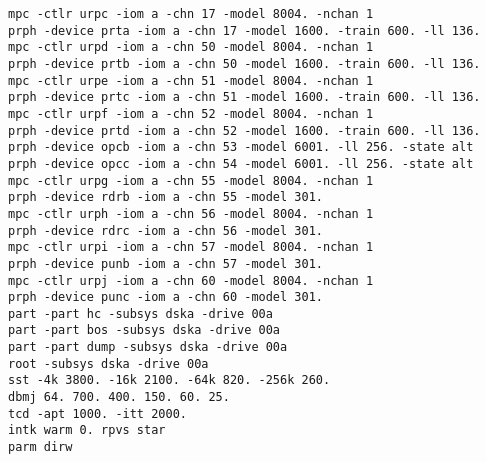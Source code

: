 \begin{adjustwidth}{5ex}{1ex}
    \texttt{mpc  -ctlr   urpc -iom a -chn 17 -model 8004. -nchan 1} \\
    \texttt{prph -device prta -iom a -chn 17 -model 1600. -train 600. -ll 136.} \\
    \texttt{mpc  -ctlr   urpd -iom a -chn 50 -model 8004. -nchan 1} \\
    \texttt{prph -device prtb -iom a -chn 50 -model 1600. -train 600. -ll 136.} \\
    \texttt{mpc  -ctlr   urpe -iom a -chn 51 -model 8004. -nchan 1} \\
    \texttt{prph -device prtc -iom a -chn 51 -model 1600. -train 600. -ll 136.} \\
    \texttt{mpc  -ctlr   urpf -iom a -chn 52 -model 8004. -nchan 1} \\
    \texttt{prph -device prtd -iom a -chn 52 -model 1600. -train 600. -ll 136.} \\
    \texttt{prph -device opcb -iom a -chn 53 -model 6001. -ll 256. -state alt} \\
    \texttt{prph -device opcc -iom a -chn 54 -model 6001. -ll 256. -state alt} \\
    \texttt{mpc  -ctlr   urpg -iom a -chn 55 -model 8004. -nchan 1} \\ 
    \texttt{prph -device rdrb -iom a -chn 55 -model 301.} \\
    \texttt{mpc  -ctlr   urph -iom a -chn 56 -model 8004. -nchan 1} \\
    \texttt{prph -device rdrc -iom a -chn 56 -model 301.} \\
    \texttt{mpc  -ctlr   urpi -iom a -chn 57 -model 8004. -nchan 1} \\
    \texttt{prph -device punb -iom a -chn 57 -model 301.} \\
    \texttt{mpc  -ctlr   urpj -iom a -chn 60 -model 8004. -nchan 1} \\
    \texttt{prph -device punc -iom a -chn 60 -model 301.} \\
    \texttt{part -part hc -subsys dska -drive 00a} \\
    \texttt{part -part bos -subsys dska -drive 00a} \\
    \texttt{part -part dump -subsys dska -drive 00a} \\
    \texttt{root -subsys dska -drive 00a} \\
    \texttt{sst  -4k 3800. -16k 2100. -64k 820. -256k 260.} \\
    \texttt{dbmj 64. 700. 400. 150. 60. 25.} \\
    \texttt{tcd -apt 1000. -itt 2000.} \\
    \texttt{intk warm 0. rpvs star} \\
    \texttt{parm dirw} \\    
\end{adjustwidth}  

